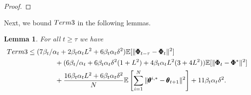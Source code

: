 \documentclass{article} %
\theoremstyle{plain}
\newtheorem{lemma}[theorem]{Lemma}
\theoremstyle{definition}
\theoremstyle{remark}
\begin{document}
{\begin{proof}
\end{proof}

{Next, we bound $\textnormal{Term 3}$ in the following lemmas.}
\begin{lemma}\label{lemma:Term3}
For all $t\geq \tau$ we have
\begin{align}\nonumber
    \textnormal{Term 3} &\leq (7\beta_t/\alpha_t+2\beta_t\alpha_t L^2+6\beta_t\alpha_t\delta^2)\mathbb{E}[\|\pmb{\Phi}_{t-\tau}-\pmb{\Phi}_t\|^2]\allowdisplaybreaks\\
    &\qquad\qquad+(6\beta_t/\alpha_t+6\beta_t\alpha_t\delta^2(1+L^2) +4\beta_t\alpha_tL^2(3+4L^2))\mathbb{E}[\|\pmb{\Phi}_t-\pmb{\Phi}^*\|^2]\nonumber\allowdisplaybreaks\\
    &\qquad\qquad+\frac{16\beta_t \alpha_t L^2+6\beta_t\alpha_t\delta^2}{N}\mathbb{E}\left[\sum_{i=1}^N\|\pmb{\theta}^{i,*}-\pmb{\theta}_{t+1}\|^2\right]+11\beta_t\alpha_t\delta^2.
\end{align}

\end{lemma}

}
\end{document}
